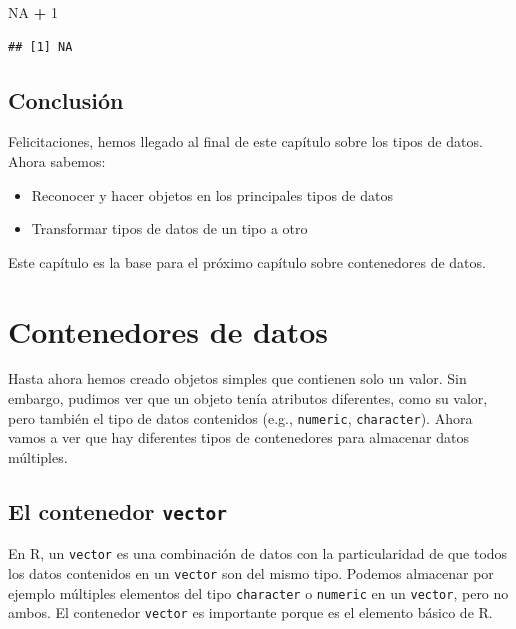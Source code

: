 \documentclass[]{book}
\newenvironment{Shaded}{\begin{snugshade}}{\end{snugshade}}
\newcommand{\DecValTok}[1]{\textcolor[rgb]{0.00,0.00,0.81}{#1}}
\newcommand{\StringTok}[1]{\textcolor[rgb]{0.31,0.60,0.02}{#1}}
\newcommand{\OtherTok}[1]{\textcolor[rgb]{0.56,0.35,0.01}{#1}}
\newcommand{\OperatorTok}[1]{\textcolor[rgb]{0.81,0.36,0.00}{\textbf{#1}}}
\providecommand{\tightlist}{%
  \setlength{\itemsep}{0pt}\setlength{\parskip}{0pt}}
\begin{document}
\begin{Shaded}
\begin{Highlighting}[]
\OtherTok{NA} \OperatorTok{+}\StringTok{ }\DecValTok{1}
\end{Highlighting}
\end{Shaded}

\begin{verbatim}
## [1] NA
\end{verbatim}

\section{Conclusión}\label{conclusion-2}

Felicitaciones, hemos llegado al final de este capítulo sobre los tipos
de datos. Ahora sabemos:

\begin{itemize}
\tightlist
\item
  Reconocer y hacer objetos en los principales tipos de datos
\item
  Transformar tipos de datos de un tipo a otro
\end{itemize}

Este capítulo es la base para el próximo capítulo sobre contenedores de
datos.

\chapter{Contenedores de datos}\label{dataType2}

Hasta ahora hemos creado objetos simples que contienen solo un valor.
Sin embargo, pudimos ver que un objeto tenía atributos diferentes, como
su valor, pero también el tipo de datos contenidos (e.g.,
\texttt{numeric}, \texttt{character}). Ahora vamos a ver que hay
diferentes tipos de contenedores para almacenar datos múltiples.

\hypertarget{l014vector}{\section{\texorpdfstring{El contenedor
\texttt{vector}}{El contenedor vector}}\label{l014vector}}

En R, un \texttt{vector} es una combinación de datos con la
particularidad de que todos los datos contenidos en un \texttt{vector}
son del mismo tipo. Podemos almacenar por ejemplo múltiples elementos
del tipo \texttt{character} o \texttt{numeric} en un \texttt{vector},
pero no ambos. El contenedor \texttt{vector} es importante porque es el
elemento básico de R.
\end{document}
